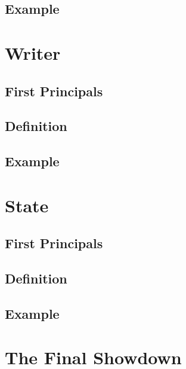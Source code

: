 \documentclass{beamer}
\begin{document}
  \subsection{Example}
  \begin{frame}
    
  \end{frame}

  \section{Writer}
  \subsection{First Principals}
  \begin{frame}
    
  \end{frame}
  \subsection{Definition}
  \begin{frame}
    
  \end{frame}
  \subsection{Example}
  \begin{frame}
    
  \end{frame}

  \section{State}
  \subsection{First Principals}
  \begin{frame}
    
  \end{frame}
  \subsection{Definition}
  \begin{frame}
    
  \end{frame}
  \subsection{Example}
  \begin{frame}
    
  \end{frame}

  \section{The Final Showdown}
  \begin{frame}
    
  \end{frame}
\end{document}
